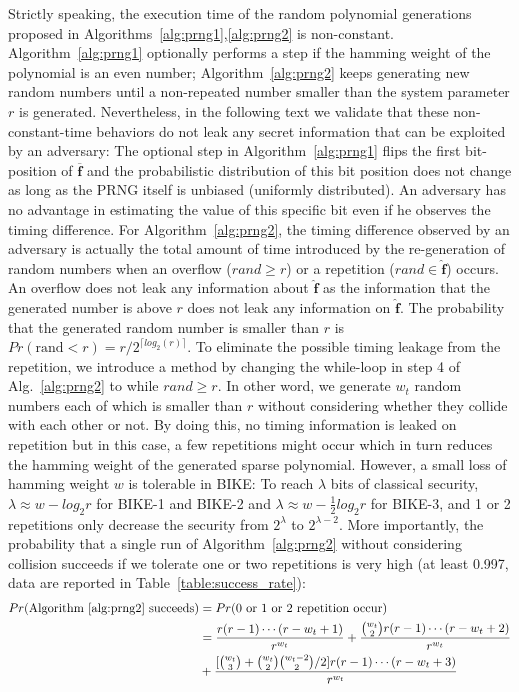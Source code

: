 \documentclass[runningheads]{llncs}
\begin{document}
Strictly speaking, the execution time of the random polynomial generations proposed in
Algorithms~\ref{alg:prng1},\ref{alg:prng2} is non-constant.
Algorithm~\ref{alg:prng1} optionally performs a step if the
hamming weight of the polynomial is an even number;
Algorithm~\ref{alg:prng2} keeps generating new random numbers
until a non-repeated number smaller than the system parameter $r$
is generated.
Nevertheless, in the following text we validate that
these non-constant-time behaviors do not leak any secret
information that can be exploited by an adversary:
The optional step in Algorithm~\ref{alg:prng1}
flips the first bit-position of $\mathbf{\overline{f}}$
and the probabilistic distribution of this bit position
does not change as long as the PRNG itself is unbiased (uniformly distributed).
An adversary has no advantage in estimating the value
of this specific bit even if he observes the timing difference.
For Algorithm~\ref{alg:prng2}, the timing difference
observed by an adversary is actually the total amount
of time introduced by the re-generation of random numbers
when an overflow ($rand\geq r$) or a repetition ($rand\in \mathbf{\hat{f}}$) occurs.
An overflow does not leak any information about $\mathbf{\hat{f}}$
as the information that the generated number is above $r$ does
not leak any information on $\mathbf{\hat{f}}$.
The probability that the generated random number is smaller
than $r$ is $Pr(\text{rand} < r)= r/2^{\lceil log_2(r)\rceil}$.
To eliminate the possible timing leakage from the repetition,
we introduce a method by changing the while-loop
in step 4 of Alg.~\ref{alg:prng2} to while $rand\geq r$.
In other word, we generate $w_t$ random numbers each
of which is smaller than $r$ without considering whether they collide
with each other or not.
By doing this, no timing information is leaked on repetition but
in this case, a few repetitions might occur which in turn reduces
the hamming weight of the generated sparse polynomial.
However, a small loss of hamming weight $w$ is tolerable in BIKE:
To reach $\lambda$ bits of classical security, $\lambda\approx w-log_2r$ for
BIKE-1 and BIKE-2 and $\lambda\approx w-\frac{1}{2}log_2r$ for BIKE-3,
and 1 or 2 repetitions only decrease the security from $2^\lambda$ to $2^{\lambda-2}$.
More importantly, the probability that a single run of Algorithm~\ref{alg:prng2} without considering collision succeeds if we tolerate one or two repetitions is very high (at least 0.997, data are reported in Table~\ref{table:success_rate}):
\begin{align}
    Pr(\text{Algorithm~\ref{alg:prng2} succeeds}) &= Pr(\text{0 or 1 or 2 repetition occur})\\
    &=\frac{r(r-1)\cdots (r-w_t+1)}{r^{w_t}}+ \frac{\binom{w_t}{2}r(r-1)\cdots (r-w_t+2)}{r^{w_t}}\\
    &+ \frac{[\binom{w_t}{3}+\binom{w_t}{2}\binom{w_t-2}{2}/2]  r(r-1)\cdots (r-w_t+3) }{r^{w_t}}
\end{align}
\end{document}

